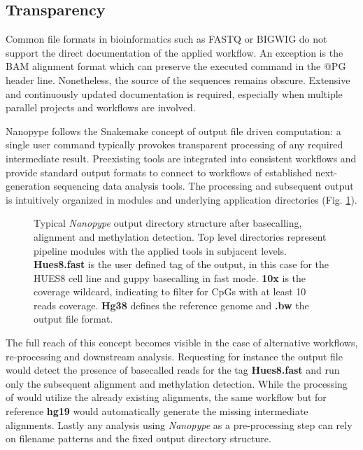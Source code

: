 \subsection{Transparency}
\label{subsec:nanopype:transparency}

Common file formats in bioinformatics such as FASTQ or BIGWIG do not support the direct documentation of the applied workflow. An exception is the BAM alignment format which can preserve the executed command in the @PG header line. Nonetheless, the source of the sequences remains obscure. Extensive and continuously updated documentation is required, especially when multiple parallel projects and workflows are involved.

Nanopype follows the Snakemake concept of output file driven computation: a single user command typically provokes transparent processing of any required intermediate result. Preexisting tools are integrated into consistent workflows and provide standard output formats to connect to workflows of established next-generation sequencing data analysis tools. The processing and subsequent output is intuitively organized in modules and underlying application directories (Fig. \ref{fig:nanopype:dir_tree}).

\begin{figure}[h]
	\centering
	\begin{minipage}{.7\linewidth}
	\end{minipage}
	\captionsetup{format=plain}
	\caption[Typical Nanopype output directory]{Typical \textit{Nanopype} output directory structure after basecalling, alignment and methylation detection. Top level directories represent pipeline modules with the applied tools in subjacent levels. \textbf{Hues8.fast} is the user defined tag of the output, in this case for the HUES8 cell line and guppy basecalling in fast mode. \textbf{10x} is the coverage wildcard, indicating to filter for CpGs with at least 10 reads coverage. \textbf{Hg38} defines the reference genome and \textbf{.bw} the output file format.}
	\label{fig:nanopype:dir_tree}
\end{figure}

The full reach of this concept becomes visible in the case of alternative workflows, re-processing and downstream analysis. Requesting for instance the output file  would detect the presence of basecalled reads for the tag \textbf{Hues8.fast} and run only the subsequent alignment and methylation detection. While the processing of  would utilize the already existing alignments, the same workflow but for reference \textbf{hg19} would automatically generate the missing intermediate alignments.
Lastly any analysis using \textit{Nanopype} as a pre-processing step can rely on filename patterns and the fixed output directory structure.




